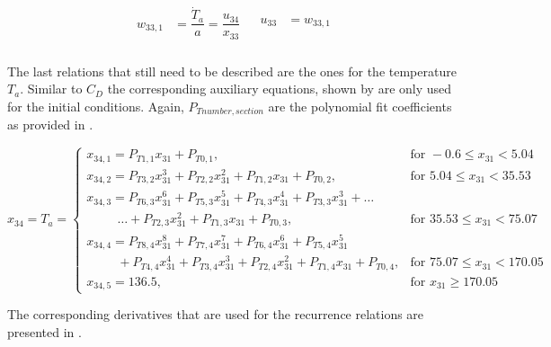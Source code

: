 \begin{align} \label{eq:u33}
\begin{split}
w_{33,1} &= \dfrac{\dot{T}_{a}}{a} = \dfrac{u_{34}}{x_{33}} \\
\end{split}
&
\begin{split}
u_{33} &= w_{33,1} \\
\end{split}
\end{align}

The last relations that still need to be described are the ones for the temperature $T_{a}$. Similar to $C_{D}$ the corresponding auxiliary equations, shown by  are only used for the initial conditions. Again, $P_{T number,section}$ are the polynomial fit coefficients as provided in .

\begin{equation}\label{eq:tempCondAux}
x_{34}=T_{a}=\begin{cases}
x_{34,1}=P_{T 1,1}x_{31}+P_{T 0,1}, & \text{for } -0.6 \leq x_{31} < 5.04  \\
x_{34,2}=P_{T 3,2}x_{31}^{3}+P_{T 2,2}x_{31}^{2}+P_{T 1,2}x_{31}+P_{T 0,2}, &  \text{for } 5.04 \leq x_{31} < 35.53   \\
x_{34,3}=P_{T 6,3}x_{31}^{6}+P_{T 5,3}x_{31}^{5}+P_{T 4,3}x_{31}^{4}+P_{T 3,3}x_{31}^{3}+ \dots \\
\qquad\ \ \dotsc +P_{T 2,3}x_{31}^{2}+P_{T 1,3}x_{31}+P_{T 0,3}, &  \text{for } 35.53 \leq x_{31} < 75.07   \\
x_{34,4}=P_{T 8,4}x_{31}^{8}+P_{T 7,4}x_{31}^{7}+P_{T 6,4}x_{31}^{6}+P_{T 5,4}x_{31}^{5} \\
\qquad\ \ +P_{T 4,4}x_{31}^{4}+P_{T 3,4}x_{31}^{3}+P_{T 2,4}x_{31}^{2}+P_{T 1,4}x_{31}+P_{T 0,4}, &  \text{for } 75.07 \leq x_{31} < 170.05   \\
x_{34,5}=136.5, &  \text{for }  x_{31} \geq 170.05   
\end{cases}
\end{equation}

The corresponding derivatives that are used for the recurrence relations are presented in .

